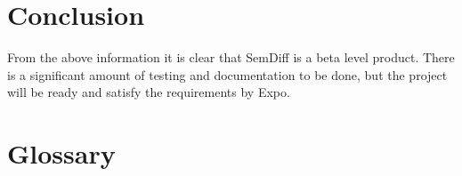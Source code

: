 \documentclass[draftclsnofoot,onecolumn]{IEEEtran}
\begin{document}
\section{Conclusion}%

From the above information it is clear that SemDiff is a beta level product. 
There is a significant amount of testing and documentation to be done, but 
the project will be ready and satisfy the requirements by Expo.

\section{Glossary}%
\end{document}
